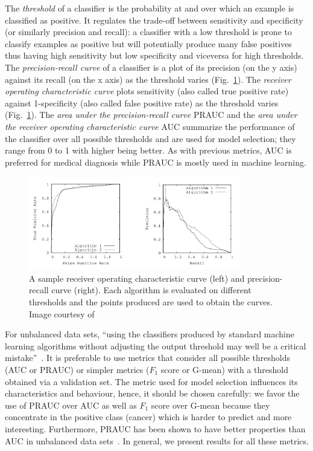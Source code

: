 The \emph{threshold} of a classifier is the probability at and over which an example is classified as positive. It regulates the trade-off between sensitivity and specificity (or similarly precision and recall): a classifier with a low threshold is prone to classify examples as positive but will potentially produce many false positives thus having high sensitivity but low specificity and viceversa for high thresholds. The \emph{precision-recall curve} of a classifier is a plot of its precision (on the y axis) against its recall (on the x axis) as the threshold varies (Fig.~\ref{fig:AUCandPRAUC}). The \emph{receiver operating characteristic curve} plots sensitivity (also called true positive rate) against 1-specificity (also called false positive rate) as the threshold varies (Fig.~\ref{fig:AUCandPRAUC}). The \emph{area under the precision-recall curve} PRAUC and the \emph{area under the receiver operating characteristic curve} AUC summarize the performance of the classifier over all possible thresholds and are used for model selection; they range from 0 to 1 with higher being better. As with previous metrics, AUC is preferred for medical diagnosis while PRAUC is mostly used in machine learning. 
\begin{figure}[h]
	\centering
	\includegraphics[width = 0.83\textwidth]{plots/AUCandPRAUC.png}
	\caption[Sample ROC and PR curves]{A sample receiver operating characteristic curve (left) and precision-recall curve (right). Each algorithm is evaluated on different thresholds and the points produced are used to obtain the curves. Image courtesy of~\cite{Davis2006}}
	\label{fig:AUCandPRAUC}
\end{figure}

For unbalanced data sets, ``using the classifiers produced by standard machine learning algorithms without adjusting the output threshold may well be a critical mistake''~\cite{Provost2000}. It is preferable to use metrics that consider all possible thresholds (AUC or PRAUC) or simpler metrics ($F_1$ score or G-mean) with a threshold obtained via a validation set. The metric used for model selection influences its characteristics and behaviour, hence, it should be chosen carefully: we favor the use of PRAUC over AUC as well as $F_1$ score over G-mean because they concentrate in the positive class (cancer) which is harder to predict and more interesting. Furthermore, PRAUC has been shown to have better properties than AUC in unbalanced data sets~\cite{Davis2006}. In general, we present results for all these metrics. 

